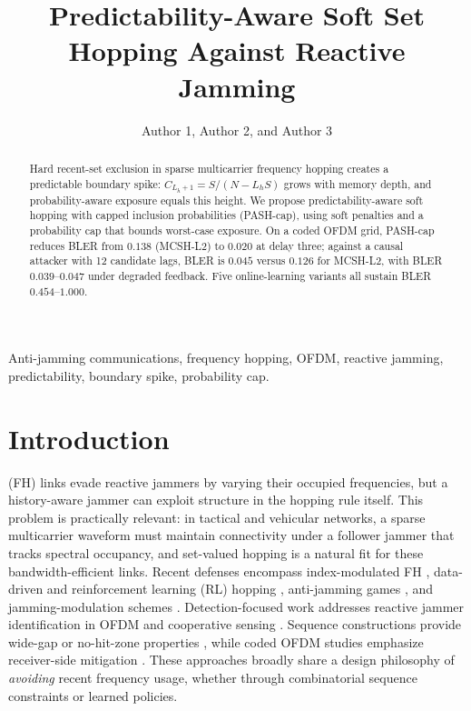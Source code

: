 \documentclass[letterpaper,journal,10pt]{IEEEtran}
\title{Predictability-Aware Soft Set Hopping Against Reactive Jamming}
\author{Author 1, Author 2, and Author 3}
\begin{document}
\maketitle

\begin{abstract}
Hard recent-set exclusion in sparse multicarrier frequency hopping
creates a predictable boundary spike:
$C_{L_h+1}=S/(N-L_hS)$ grows with memory depth, and
probability-aware exposure equals this height. We propose
predictability-aware soft hopping with capped inclusion probabilities
(PASH-cap), using soft penalties and a probability cap that bounds
worst-case exposure. On a coded OFDM grid, PASH-cap reduces BLER from
$0.138$ (MCSH-L2) to $0.020$ at delay three; against a causal attacker with 12
candidate lags, BLER is $0.045$ versus $0.126$ for MCSH-L2, with BLER $0.039$--$0.047$ under degraded feedback.
Five online-learning variants all sustain BLER $0.454$--$1.000$.
\end{abstract}

\begin{IEEEkeywords}
Anti-jamming communications, frequency hopping, OFDM, reactive jamming,
predictability, boundary spike, probability cap.
\end{IEEEkeywords}

\section{Introduction}
 (FH) links evade reactive jammers by varying their occupied
frequencies, but a history-aware jammer can exploit structure in the hopping
rule itself. This problem is practically relevant: in tactical and vehicular
networks, a sparse multicarrier waveform must maintain connectivity under a
follower jammer that tracks spectral occupancy, and set-valued hopping is a
natural fit for these bandwidth-efficient links. Recent defenses encompass index-modulated FH
\cite{shi2022enhanced}, data-driven and reinforcement learning (RL) hopping
\cite{zhou2024,zhang2024block,qi2024,cheng2025,chen2026dual}, anti-jamming games
\cite{zhang2024game}, and jamming-modulation schemes \cite{ma2023}.
Detection-focused work addresses reactive jammer identification in OFDM
\cite{altun2022reactive,wesolowski2023detection} and cooperative sensing
\cite{li2024}. Sequence constructions provide wide-gap or no-hit-zone
properties \cite{shu2024widegap,zheng2025widegap}, while coded OFDM studies
emphasize receiver-side mitigation \cite{mailaender2013,kaplan2023,chen2023,mendonca2024channel,wu2026llr}.
These approaches broadly share a design philosophy of \emph{avoiding} recent
frequency usage, whether through combinatorial sequence constraints or learned
policies.
\end{document}
